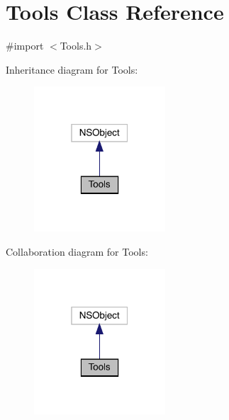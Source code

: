 \hypertarget{interface_tools}{}\section{Tools Class Reference}
\label{interface_tools}


{\ttfamily \#import $<$Tools.\+h$>$}



Inheritance diagram for Tools\+:\nopagebreak
\begin{figure}[H]
\begin{center}
\leavevmode
\includegraphics[width=139pt]{interface_tools__inherit__graph}
\end{center}
\end{figure}


Collaboration diagram for Tools\+:\nopagebreak
\begin{figure}[H]
\begin{center}
\leavevmode
\includegraphics[width=139pt]{interface_tools__coll__graph}
\end{center}
\end{figure}
